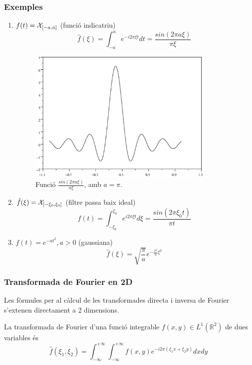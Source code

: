 \documentclass{article}
\def\R{\mathbb R}
\begin{document}
\subsubsection{Exemples}
\begin{enumerate}[Exemple 1]
\item $f(t)={\cal X}_{[-a, a]}$ (funci\'o indicatriu)
\[
\hat{f}(\xi)=\int_{-a}^{a} e^{- i 2 \pi \xi t} dt = \frac{sin(2\pi a \xi)}{\pi \xi}
\]

\begin{figure}[htbp]
\begin{center}
\includegraphics[width=9cm]{imatges/sincPi.eps}
\caption{Funci\'o $\frac{sin(2 \pi a \xi)}{\pi \xi}$, amb $a=\pi$.}
\end{center} 
\end{figure}

\item $\hat{f}(\xi)={\cal X}_{[-\xi_0, \xi_0]}$ (filtre passa baix ideal)
\[
f(t)=\int_{-\xi_0}^{\xi_0} e^{i 2\pi \xi t} d\xi=
\frac{sin(2 \pi \xi_0 t)}{\pi t}
\]
\item $f(t)=e^{-a t^2}, a > 0$ (gaussiana)
\[
\hat{f}(\xi)=\sqrt{\frac{\pi}{a}} e^{-\frac{\pi^2}{a} \xi^2}
\]
\end{enumerate} 

\subsubsection{Transformada de Fourier en 2D}
\label{TFbidimensional}
Les f\`ormules per al c\`alcul de les transformades directa i inversa
de Fourier s'extenen directament a 2 dimensions.

La transformada de Fourier d'una funci\'o integrable $f(x,y) \in L^1(\R^2)$
de dues variables \'es
\begin{equation}
\label{TF2D}
\hat{f}(\xi_1,\xi_2)=\int_{-\infty}^{+\infty} \int_{-\infty}^{+\infty} 
f(x,y) e^{-i 2 \pi (\xi_1 x+\xi_2 y)} dx dy
\end{equation}
\end{document}
